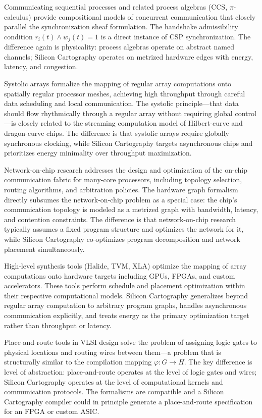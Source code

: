 \documentclass[11pt, a4paper]{article}
\begin{document}
Communicating sequential processes and related process algebras (CCS, $\pi$-calculus)
provide compositional models of concurrent communication that closely parallel the
synchronization sheaf formulation. The handshake admissibility condition $r_i(t)
\wedge w_j(t) = 1$ is a direct instance of CSP synchronization. The difference
again is physicality: process algebras operate on abstract named channels; Silicon
Cartography operates on metrized hardware edges with energy, latency, and congestion.

Systolic arrays formalize the mapping of regular array computations onto spatially
regular processor meshes, achieving high throughput through careful data scheduling
and local communication. The systolic principle---that data should flow rhythmically
through a regular array without requiring global control---is closely related to
the streaming computation model of Hilbert-curve and dragon-curve chips. The
difference is that systolic arrays require globally synchronous clocking, while
Silicon Cartography targets asynchronous chips and prioritizes energy minimality
over throughput maximization.

Network-on-chip research addresses the design and optimization of the on-chip
communication fabric for many-core processors, including topology selection,
routing algorithms, and arbitration policies. The hardware graph formalism directly
subsumes the network-on-chip problem as a special case: the chip's communication
topology is modeled as a metrized graph with bandwidth, latency, and contention
constraints. The difference is that network-on-chip research typically assumes a
fixed program structure and optimizes the network for it, while Silicon Cartography
co-optimizes program decomposition and network placement simultaneously.

High-level synthesis tools (Halide, TVM, XLA) optimize the mapping of array
computations onto hardware targets including GPUs, FPGAs, and custom accelerators.
These tools perform schedule and placement optimization within their respective
computational models. Silicon Cartography generalizes beyond regular array
computation to arbitrary program graphs, handles asynchronous communication
explicitly, and treats energy as the primary optimization target rather than
throughput or latency.

Place-and-route tools in VLSI design solve the problem of assigning logic gates
to physical locations and routing wires between them---a problem that is structurally
similar to the compilation mapping $\varphi : G \to H$. The key difference is level
of abstraction: place-and-route operates at the level of logic gates and wires;
Silicon Cartography operates at the level of computational kernels and communication
protocols. The formalisms are compatible and a Silicon Cartography compiler could
in principle generate a place-and-route specification for an FPGA or custom ASIC.
\end{document}
